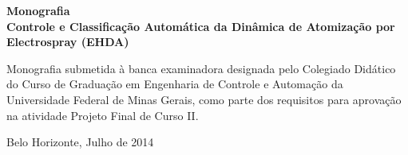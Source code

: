 \begin{titlepage}

\centering
\textbf{Monografia}\\
\vspace{2cm}
\centering
\textbf{Controle e Classificação Automática da Dinâmica de Atomização por Electrospray (EHDA)}\\
\vspace{5cm} 

\parbox{1.0\textwidth} 
{\large 
Monografia submetida à banca examinadora
designada pelo Colegiado Didático do Curso de
Graduação em Engenharia de Controle e
Automação da Universidade Federal de Minas
Gerais, como parte dos requisitos para aprovação na
atividade Projeto Final de Curso II.}

\vspace{7cm} 
\centering
Belo Horizonte, Julho de 2014

\end{titlepage}
